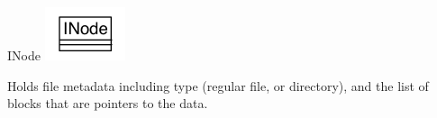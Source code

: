 \begin{XeClass}{INode}
\includegraphics[width=\textwidth]{cdig/INode.png}
     
 Holds file metadata including type (regular file, or directory),
 and the list of blocks that are pointers to the data.

\end{XeClass}
